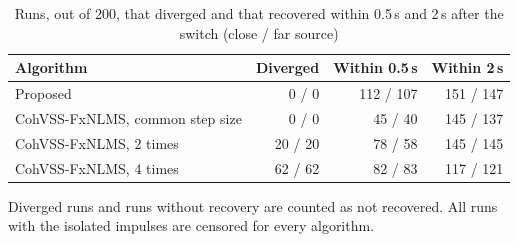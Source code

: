 \begin{table}[tbp]
\centering
\footnotesize
\setlength{\tabcolsep}{4pt}
\caption{Runs, out of 200, that diverged and that recovered within 0.5\,s and 2\,s after the switch (close / far source)}
\label{tab:atsip-8}
\par\smallskip
\begin{tabular}{lrrr}
\toprule
Algorithm & Diverged & Within 0.5\,s & Within 2\,s \\
\midrule
Proposed & 0 / 0 & 112 / 107 & 151 / 147 \\
CohVSS-FxNLMS, common step size & 0 / 0 & 45 / 40 & 145 / 137 \\
CohVSS-FxNLMS, 2 times & 20 / 20 & 78 / 58 & 145 / 145 \\
CohVSS-FxNLMS, 4 times & 62 / 62 & 82 / 83 & 117 / 121 \\
\bottomrule
\end{tabular}
\par\medskip
\begin{minipage}{0.98\linewidth}
\footnotesize
Diverged runs and runs without recovery are counted as not recovered. All runs with the isolated impulses are censored for every algorithm.\par
\end{minipage}
\end{table}
